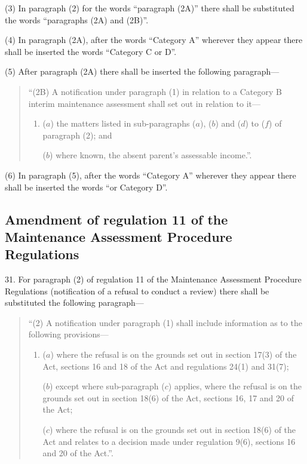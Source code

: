 \documentclass[a4paper]{article}
\begin{document}
(3) In paragraph (2) for the words “paragraph (2A)” there shall be substituted the words “paragraphs (2A) and (2B)”.

(4) In paragraph (2A), after the words “Category A” wherever they appear there shall be inserted the words “Category C or D”.

(5) After paragraph (2A) there shall be inserted the following paragraph—
\begin{quotation}
“(2B) A notification under paragraph (1) in relation to a Category B interim maintenance assessment shall set out in relation to it—
\begin{enumerate}\item[]
($a$) the matters listed in sub-paragraphs ($a$), ($b$) and ($d$) to ($f$) of paragraph (2); and

($b$) where known, the absent parent’s assessable income.”.
\end{enumerate}
\end{quotation}

(6) In paragraph (5), after the words “Category A” wherever they appear there shall be inserted the words “or Category D”.

\subsection[31. Amendment of regulation 11 of the Maintenance Assessment Procedure Regulations]{Amendment of regulation 11 of the Maintenance Assessment Procedure Regulations}

31.  For paragraph (2) of regulation 11 of the Maintenance Assessment Procedure Regulations (notification of a refusal to conduct a review) there shall be substituted the following paragraph—
\begin{quotation}
“(2) A notification under paragraph (1) shall include information as to the following provisions—
\begin{enumerate}\item[]
($a$) where the refusal is on the grounds set out in section 17(3) of the Act, sections 16 and 18 of the Act and regulations 24(1) and 31(7);

($b$) except where sub-paragraph ($c$) applies, where the refusal is on the grounds set out in section 18(6) of the Act, sections 16, 17 and 20 of the Act;

($c$) where the refusal is on the grounds set out in section 18(6) of the Act and relates to a decision made under regulation 9(6), sections 16 and 20 of the Act.”.
\end{enumerate}
\end{quotation}
\end{document}
